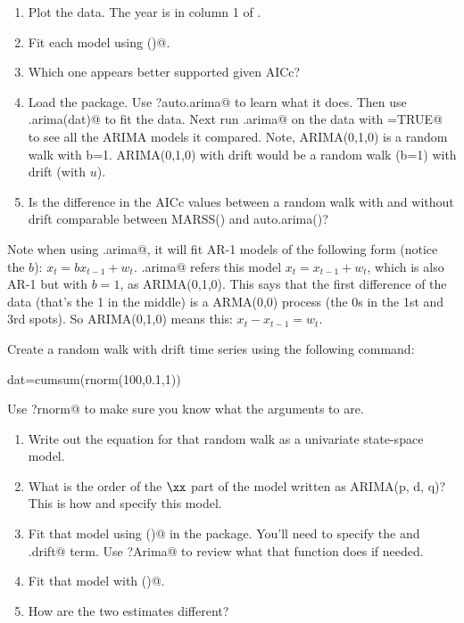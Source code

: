 \begin{hwenumerate}
\begin{enumerate}[label=\alph*)]
\item Plot the data. The year is in column 1 of \verb@grouse@.
\item Fit each model using \verb@MARSS()@.
\item Which one appears better supported given AICc?
\item Load the \verb@forecast@ package. Use \verb@?auto.arima@ to learn what it does.  Then use \verb@auto.arima(dat)@  to fit the data.  Next run \verb@auto.arima@ on the data with \verb@trace=TRUE@ to see all the ARIMA models it compared. Note, ARIMA(0,1,0) is a random walk with b=1.  ARIMA(0,1,0) with drift would be a random walk (b=1) with drift (with $u$).   
\item Is the difference in the AICc values between a random walk with and without drift comparable between MARSS() and auto.arima()?
\end{enumerate}

Note when using \verb@auto.arima@, it will fit AR-1 models of the following form (notice the $b$): $x_t = b x_{t-1}+w_t$.  \verb@auto.arima@ refers this model $x_t = x_{t-1}+w_t$, which is also AR-1 but with $b=1$, as ARIMA(0,1,0).  This says that the first difference of the data (that's the 1 in the middle) is a ARMA(0,0) process (the 0s in the 1st and 3rd spots).  So ARIMA(0,1,0) means this: $x_t - x_{t-1} = w_t$.  

\item\label{hw-uniss-2} Create a random walk with drift time series using the following command:
\begin{Schunk}
\begin{Sinput}
 dat=cumsum(rnorm(100,0.1,1))
\end{Sinput}
\end{Schunk}
Use \verb@?rnorm@ to make sure you know what the arguments to \verb@rnorm@ are.

\begin{enumerate}[label=\alph*)]
\item Write out the equation for that random walk as a univariate state-space model. 
\item What is the order of the $\xx$ part of the model written as ARIMA(p, d, q)?  This is how \verb@arima@ and \verb@Arima@ specify this model.
\item Fit that model using \verb@Arima()@ in the \verb@forecast@ package.  You'll need to specify the \verb@order@ and \verb@include.drift@ term.  Use \verb@?Arima@ to review what that function does if needed.
\item Fit that model with \verb@MARSS()@.
\item How are the two estimates different?
\end{enumerate}


\end{hwenumerate}
